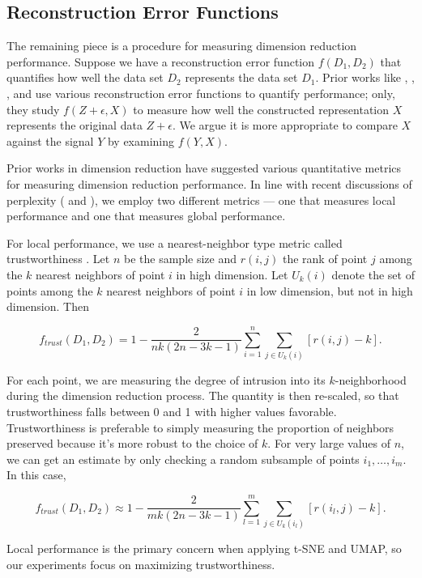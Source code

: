 \documentclass{article}
\begin{document}
\subsection{Reconstruction Error Functions}
The remaining piece is a procedure for measuring dimension reduction performance. Suppose we have a reconstruction error function $f(D_1, D_2)$ that quantifies how well the data set $D_2$ represents the data set $D_1$. Prior works like \cite{evaluation of DR transcriptomics}, \cite{t-SNE cell} , \cite{large DR unreliable}, and \cite{quantitative survey} use various reconstruction error functions to quantify performance; only, they study $f(Z + \epsilon, X)$ to measure how well the constructed representation $X$ represents the original data $Z + \epsilon$. We argue it is more appropriate to compare $X$ against the signal $Y$ by examining $f(Y, X)$.

Prior works in dimension reduction have suggested various quantitative metrics for measuring dimension reduction performance. In line with recent discussions of perplexity (\cite{t-SNE cell} and \cite{large DR unreliable}), we employ two different metrics --- one that measures local performance and one that measures global performance.

For local performance, we use a nearest-neighbor type metric called trustworthiness \cite{trustworthiness}. Let $n$ be the sample size and $r(i,j)$ the rank of point $j$ among the $k$ nearest neighbors of point $i$ in high dimension. Let $U_k(i)$ denote the set of points among the $k$ nearest neighbors of point $i$ in low dimension, but not in high dimension. Then \begin{linenomath}$$f_{trust}(D_1, D_2) = 1 - \frac{2}{nk(2n - 3k - 1)}\sum_{i=1}^n \sum_{j \in U_k(i)} \left[ r(i,j) - k \right].$$\end{linenomath} For each point, we are measuring the degree of intrusion into its $k$-neighborhood during the dimension reduction process. The quantity is then re-scaled, so that trustworthiness falls between 0 and 1 with higher values favorable. Trustworthiness is preferable to simply measuring the proportion of neighbors preserved because it's more robust to the choice of $k$. For very large values of $n$, we can get an estimate by only checking a random subsample of points $i_1, \hdots, i_m$. In this case, \begin{linenomath}$$f_{trust}(D_1, D_2) \approx 1 - \frac{2}{mk(2n - 3k - 1)}\sum_{l=1}^m \sum_{j \in U_k(i_l)} \left[ r(i_l,j) - k \right].$$\end{linenomath} Local performance is the primary concern when applying t-SNE and UMAP, so our experiments focus on maximizing trustworthiness.
\end{document}
